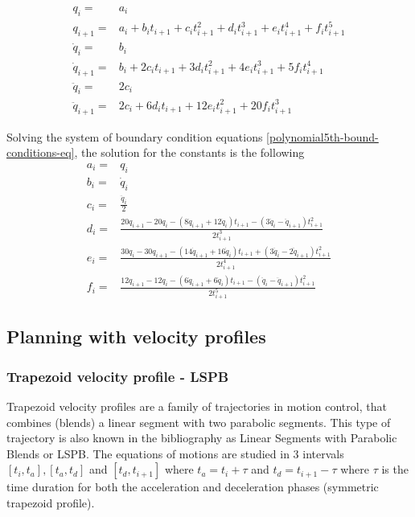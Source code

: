 \begin{equation}
\label{polynomial5th-bound-conditions-eq}
\begin{aligned}
q_i ={}& a_i \\
q_{i+1} ={}& a_i + b_it_{i+1} + c_it_{i+1}^2 + d_it_{i+1}^3 + e_it_{i+1}^4 + f_it_{i+1}^5 \\
\dot{q}_i ={}& b_i \\ 
\dot{q}_{i+1} ={}& b_i + 2c_it_{i+1} + 3d_it_{i+1}^2 + 4e_it_{i+1}^3 + 5f_it_{i+1}^4 \\
\ddot{q}_i ={}& 2c_i \\
\ddot{q}_{i+1} ={}& 2c_i + 6d_it_{i+1} + 12e_it_{i+1}^2 + 20f_it_{i+1}^3
\end{aligned}
\end{equation}

Solving the system of boundary condition equations \ref{polynomial5th-bound-conditions-eq}, the solution for the constants is the following
\begin{equation}
\begin{aligned}
a_i ={}& q_i \\
b_i ={}& \dot{q}_i \\
c_i ={}& \frac{\ddot{q}_i}{2} \\
d_i ={}& \frac{20q_{i+1} - 20q_i - (8\dot{q}_{i+1} + 12\dot{q}_i)t_{i+1} - (3\ddot{q}_i - \ddot{q}_{i+1})t_{i+1}^2 }{2t_{i+1}^3} \\
e_i ={}& \frac{30q_i - 30q_{i+1} - (14\dot{q}_{i+1} + 16\dot{q}_i)t_{i+1} + (3\ddot{q}_i - 2\ddot{q}_{i+1})t_{i+1}^2}{2t_{i+1}^4} \\
f_i ={}& \frac{12q_{i+1} - 12q_i - (6\dot{q}_{i+1} + 6\dot{q}_i)t_{i+1} - (\ddot{q}_i - \ddot{q}_{i+1})t_{i+1}^2 }{2t_{i+1}^5}
\end{aligned}
\end{equation}


\subsection{Planning with velocity profiles}

\subsubsection{Trapezoid velocity profile - LSPB}

Trapezoid velocity profiles are a family of trajectories in motion control, that combines (blends) a linear segment with two parabolic segments. This type of trajectory is also known in the bibliography as 
Linear Segments with Parabolic Blends or LSPB. The equations of motions are studied in 3 intervals $[t_i, t_a], [t_a, t_d]$ and $[t_d, t_{i+1}]$ where $t_a = t_i + τ$ and $t_d = t_{i+1} - τ$ where $τ$ is 
the time duration for both the acceleration and deceleration phases (symmetric trapezoid profile). \\

